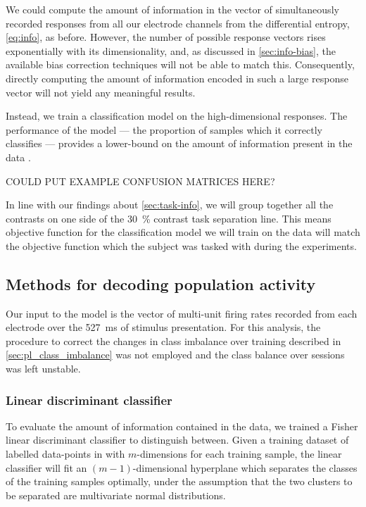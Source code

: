We could compute the amount of information in the vector of simultaneously recorded responses from all our electrode channels from the differential entropy, \autoref{eq:info}, as before.
However, the number of possible response vectors rises exponentially with its dimensionality, and, as discussed in \autoref{sec:info-bias}, the available bias correction techniques will not be able to match this.
Consequently, directly computing the amount of information encoded in such a large response vector will not yield any meaningful results.

Instead, we train a classification model on the high-dimensional responses.
The performance of the model --- the proportion of samples which it correctly classifies --- provides a lower-bound on the amount of information present in the data \citep{Quiroga2009}.

COULD PUT EXAMPLE CONFUSION MATRICES HERE?

In line with our findings about \autoref{sec:task-info}, we will group together all the contrasts on one side of the \SI{30}{\percent} contrast task separation line.
This means objective function for the classification model we will train on the data will match the objective function which the subject was tasked with during the experiments.


\subsection{Methods for decoding population activity}

Our input to the model is the vector of multi-unit firing rates recorded from each electrode over the \SI{527}{\milli\second} of stimulus presentation.
For this analysis, the procedure to correct the changes in class imbalance over training described in \autoref{sec:pl_class_imbalance} was not employed and the class balance over sessions was left unstable.


\subsubsection{Linear discriminant classifier}

To evaluate the amount of information contained in the data, we trained a Fisher linear discriminant classifier to distinguish between.
Given a training dataset of labelled data-points in with $m$-dimensions for each training sample, the linear classifier will fit an $(m-1)$-dimensional hyperplane which separates the classes of the training samples optimally, under the assumption that the two clusters to be separated are multivariate normal distributions.

